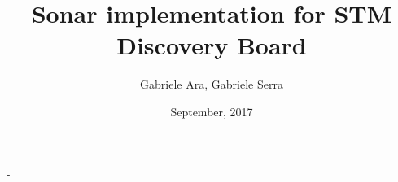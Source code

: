 \documentclass[11pt,a4paper,oneside]{memoir}
\title{Sonar implementation for STM Discovery Board}
\author{Gabriele Ara, Gabriele Serra}
\date{September, 2017}
\begin{document}
\frontmatter

\begin{titlingpage}
  \calccentering{\unitlength}
  \begin{adjustwidth*}{\unitlength-24pt}{-\unitlength-24pt}
    \maketitle
  \end{adjustwidth*}
\end{titlingpage}



\cleartorecto
\tableofcontents
\mainmatter













\appendix


\backmatter


\end{document}

